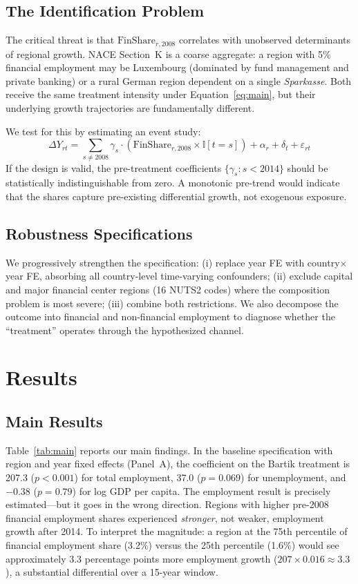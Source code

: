 \documentclass[12pt]{article}
\newcommand{\ind}{\mathbb{I}}
\begin{document}
\subsection{The Identification Problem}

The critical threat is that $\text{FinShare}_{r,2008}$ correlates with unobserved determinants of regional growth. NACE Section~K is a coarse aggregate: a region with 5\% financial employment may be Luxembourg (dominated by fund management and private banking) or a rural German region dependent on a single \emph{Sparkasse}. Both receive the same treatment intensity under Equation~\eqref{eq:main}, but their underlying growth trajectories are fundamentally different.

We test for this by estimating an event study:
\begin{equation}
\Delta Y_{rt} = \sum_{s \neq 2008} \gamma_s \cdot (\text{FinShare}_{r,2008} \times \ind[t = s]) + \alpha_r + \delta_t + \varepsilon_{rt}
\label{eq:eventstudy}
\end{equation}
If the design is valid, the pre-treatment coefficients $\{\gamma_s : s < 2014\}$ should be statistically indistinguishable from zero. A monotonic pre-trend would indicate that the shares capture pre-existing differential growth, not exogenous exposure.

\subsection{Robustness Specifications}

We progressively strengthen the specification: (i) replace year FE with country$\times$year FE, absorbing all country-level time-varying confounders; (ii) exclude capital and major financial center regions (16 NUTS2 codes) where the composition problem is most severe; (iii) combine both restrictions. We also decompose the outcome into financial and non-financial employment to diagnose whether the ``treatment'' operates through the hypothesized channel.

\section{Results}

\subsection{Main Results}

Table~\ref{tab:main} reports our main findings. In the baseline specification with region and year fixed effects (Panel~A), the coefficient on the Bartik treatment is 207.3 ($p < 0.001$) for total employment, 37.0 ($p = 0.069$) for unemployment, and $-0.38$ ($p = 0.79$) for log GDP per capita. The employment result is precisely estimated---but it goes in the wrong direction. Regions with higher pre-2008 financial employment shares experienced \emph{stronger}, not weaker, employment growth after 2014. To interpret the magnitude: a region at the 75th percentile of financial employment share (3.2\%) versus the 25th percentile (1.6\%) would see approximately 3.3 percentage points more employment growth ($207 \times 0.016 \approx 3.3$), a substantial differential over a 15-year window.
\end{document}
